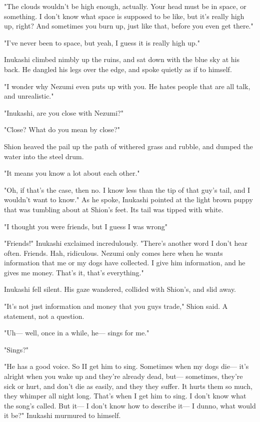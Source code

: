 "The clouds wouldn't be high enough, actually. Your head must be in
space, or something. I don't know what space is supposed to be like, but
it's really high up, right? And sometimes you burn up, just like that,
before you even get there."

"I've never been to space, but yeah, I guess it is really high up."

Inukashi climbed nimbly up the ruins, and sat down with the blue sky at
his back. He dangled his legs over the edge, and spoke quietly as if to
himself.

"I wonder why Nezumi even puts up with you. He hates people that are all
talk, and unrealistic."

"Inukashi, are you close with Nezumi?"

"Close? What do you mean by close?"

Shion heaved the pail up the path of withered grass and rubble, and
dumped the water into the steel drum.

"It means you know a lot about each other."

"Oh, if that's the case, then no. I know less than the tip of that guy's
tail, and I wouldn't want to know." As he spoke, Inukashi pointed at the
light brown puppy that was tumbling about at Shion's feet. Its tail was
tipped with white.

"I thought you were friends, but I guess I was wrong\el "

"Friends!" Inukashi exclaimed incredulously. "There's another word I
don't hear often. Friends. Hah, ridiculous. Nezumi only comes here when
he wants information that me or my dogs have collected. I give him
information, and he gives me money. That's it, that's everything."

Inukashi fell silent. His gaze wandered, collided with Shion's, and slid
away.

"It's not just information and money that you guys trade," Shion said. A
statement, not a question.

"Uh--- well, once in a while, he--- sings for me."

"Sings?"

"He has a good voice. So I\el I get him to sing. Sometimes when my dogs
die--- it's alright when you wake up and they're already dead, but---
sometimes, they're sick or hurt, and don't die as easily, and they\el 
they suffer. It hurts them so much, they whimper all night long. That's
when I get him to sing. I don't know what the song's called. But it--- I
don't know how to describe it--- I dunno, what would it be?" Inukashi
murmured to himself.

